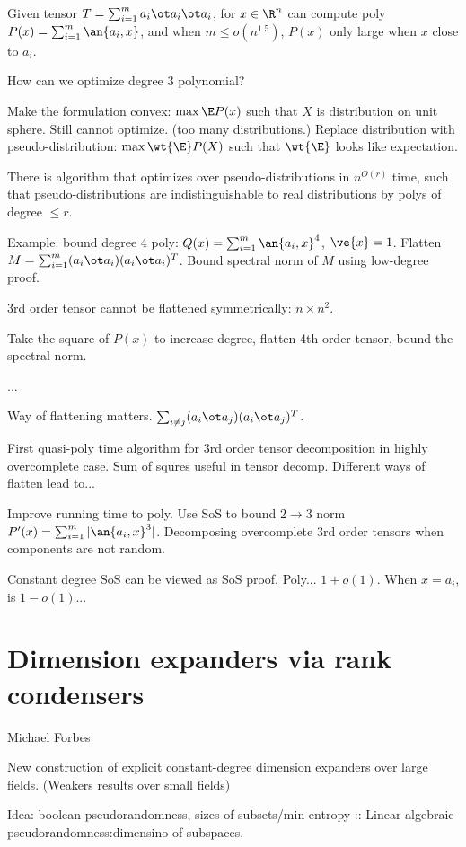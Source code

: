 Given tensor $T=\sum_{i=1}^ma_i\ot a_i\ot a_i$, for $x\in \R^n$ can compute poly $P(x)=\sum_{i=1}^m \an{a_i,x}$, and when $m\le o(n^{1.5})$, $P(x)$ only large when $x$ close to $a_i$.

How can we optimize degree 3 polynomial?

Make the formulation convex: $\max \E P(x)$ such that $X$ is distribution on unit sphere. Still cannot optimize. (too many distributions.)
%
Replace distribution with pseudo-distribution: $\max \wt{\E}P(X)$ such that $\wt{\E}$ looks like expectation.

There is algorithm that optimizes over pseudo-distributions in $n^{O(r)}$ time, such that pseudo-distributions are indistinguishable to real distributions by polys of degree $\le r$.

Example: bound degree 4 poly: $Q(x)=\sum_{i=1}^m\an{a_i,x}^4$, $\ve{x}=1$. Flatten $M=\sum_{i=1}^m (a_i\ot a_i)(a_i\ot a_i)^T$. Bound spectral norm of $M$ using low-degree proof.

3rd order tensor cannot be flattened symmetrically: $n\times n^2$.

Take the square of $P(x)$ to increase degree, flatten 4th order tensor, bound the spectral norm.

...

Way of flattening matters. $\sum_{i\ne j} (a_i\ot a_j)(a_i\ot a_j)^T$.

First quasi-poly time algorithm for 3rd order tensor decomposition in highly overcomplete case. Sum of squres useful in tensor decomp. Different ways of flatten lead to...

Improve running time to poly. Use SoS to bound $2\to 3$ norm $P'(x)=\sum_{i=1}^m |\an{a_i,x}^3|$. 
Decomposing overcomplete 3rd order tensors when components are not random.

Constant degree SoS can be viewed as SoS proof. Poly... $1+o(1)$. When $x=a_i$, is $1-o(1)$...

\section{Dimension expanders via rank condensers}

Michael Forbes

\begin{thm}
New construction of explicit constant-degree dimension expanders over large fields. (Weakers results over small fields)
\end{thm}
Idea: boolean pseudorandomness, sizes of subsets/min-entropy :: Linear algebraic pseudorandomness:dimensino of subspaces.

